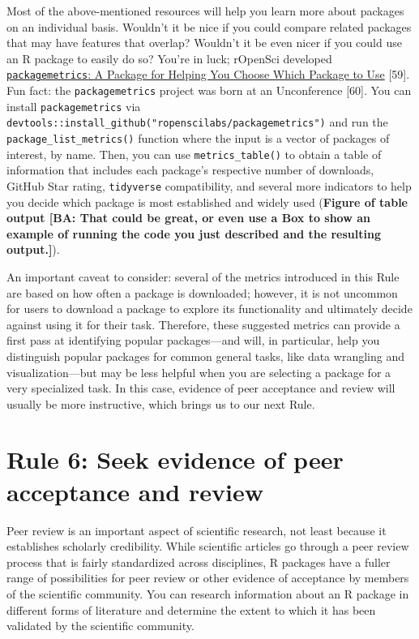 \documentclass[10pt,letterpaper]{article}
\begin{document}
Most of the above-mentioned resources will help you learn more about
packages on an individual basis. Wouldn't it be nice if you could
compare related packages that may have features that overlap? Wouldn't
it be even nicer if you could use an R package to easily do so? You're
in luck; rOpenSci developed
\href{https://docs.ropensci.org/packagemetrics/}{\texttt{packagemetrics}:
A Package for Helping You Choose Which Package to Use} {[}59{]}. Fun
fact: the \texttt{packagemetrics} project was born at an Unconference
{[}60{]}. You can install \texttt{packagemetrics} via
\texttt{devtools::install\_github("ropenscilabs/packagemetrics")} and
run the \texttt{package\_list\_metrics()} function where the input is a
vector of packages of interest, by name. Then, you can use
\texttt{metrics\_table()} to obtain a table of information that includes
each package's respective number of downloads, GitHub Star rating,
\texttt{tidyverse} compatibility, and several more indicators to help
you decide which package is most established and widely used
(\textbf{Figure of table output {[}BA: That could be great, or even use
a Box to show an example of running the code you just described and the
resulting output.{]}}).

An important caveat to consider: several of the metrics introduced in
this Rule are based on how often a package is downloaded; however, it is
not uncommon for users to download a package to explore its
functionality and ultimately decide against using it for their task.
Therefore, these suggested metrics can provide a first pass at
identifying popular packages---and will, in particular, help you
distinguish popular packages for common general tasks, like data
wrangling and visualization---but may be less helpful when you are
selecting a package for a very specialized task. In this case, evidence
of peer acceptance and review will usually be more instructive, which
brings us to our next Rule.

\hypertarget{rule-6-seek-evidence-of-peer-acceptance-and-review}{%
\section{Rule 6: Seek evidence of peer acceptance and
review}\label{rule-6-seek-evidence-of-peer-acceptance-and-review}}

Peer review is an important aspect of scientific research, not least
because it establishes scholarly credibility. While scientific articles
go through a peer review process that is fairly standardized across
disciplines, R packages have a fuller range of possibilities for peer
review or other evidence of acceptance by members of the scientific
community. You can research information about an R package in different
forms of literature and determine the extent to which it has been
validated by the scientific community.
\end{document}
